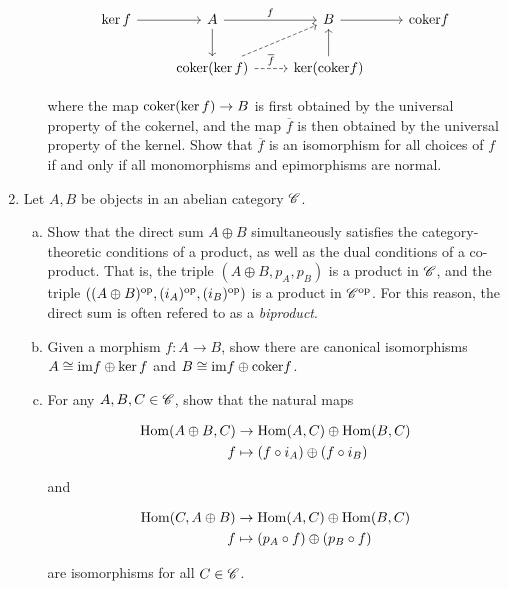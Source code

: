 \documentclass{article}
\theoremstyle{definition}
\numberwithin{figure}{section}
\begin{document}
\begin{enumerate}[\thesection .1.]
\begin{enumerate}[(a)]
\[\begin{tikzcd}
	{\ker f} & A & B & {\coker f} \\
	& {\coker (\ker f)} & {\ker (\coker f)}
	\arrow[from=1-1, to=1-2]
	\arrow["f", from=1-2, to=1-3]
	\arrow[from=1-3, to=1-4]
	\arrow[from=1-2, to=2-2]
	\arrow[from=2-3, to=1-3]
	\arrow[dashed, from=2-2, to=1-3]
	\arrow["{\overline{f}}", dashed, from=2-2, to=2-3]
\end{tikzcd}\]

where the map $\mathrm{coker} (\ker f)\to B$ is first obtained by the universal property of the cokernel, and the map $\overline{f}$ is then obtained by the universal property of the kernel. Show that $\overline{f}$ is an isomorphism for all choices of $f$ if and only if all monomorphisms and epimorphisms are normal.
\end{enumerate}

\item Let $A,B$ be objects in an abelian category $\mathscr{C}$.

\begin{enumerate}[(a)]
\item Show that the direct sum  $A\oplus B$ simultaneously satisfies the category-theoretic conditions of a product, as well as the dual conditions of a co-product. That is, the triple $(A\oplus B, p_A, p_B)$ is a product in $\mathscr{C}$, and the triple $((A\oplus B)^{\mathrm{op}}, (i_A)^{\mathrm{op}},(i_B)^{\mathrm{op}})$ is a product in $\mathscr{C}^{\mathrm{op}}$. For this reason, the direct sum is often refered to as a \textit{biproduct}.

\item Given a morphism $f:A\to B$, show there are canonical isomorphisms $A\cong \mathrm{im} f\oplus \ker f$ and $B\cong \mathrm{im} f\oplus \mathrm{coker} f$.

\item For any $A,B,C\in \mathscr{C}$, show that the natural maps

\begin{align*}
\mathrm{Hom}(A\oplus B,C)&\to \mathrm{Hom}(A,C)\oplus \mathrm{Hom}(B,C)\\
f & \mapsto (f\circ i_A)\oplus (f\circ i_B)
\end{align*}

and

\begin{align*}
\mathrm{Hom}(C, A\oplus B)&\to \mathrm{Hom}(A,C)\oplus \mathrm{Hom}(B,C)\\
f &\mapsto (p_A\circ f)\oplus (p_B\circ f)
\end{align*}

are isomorphisms for all $C\in \mathscr{C}$.
\end{enumerate}


\end{enumerate}
\end{document}
